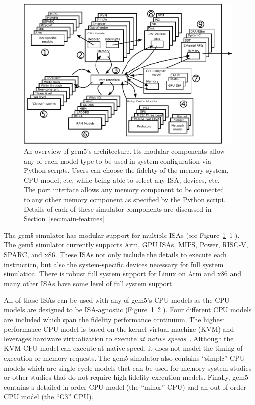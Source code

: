 \begin{figure}
  \centering
  \includegraphics[width=\textwidth]{fig/gem5-big-picture}
  \caption{An overview of gem5's architecture. Its modular components allow any of each model type to be used in system configuration via Python scripts. Users can choose the fidelity of the memory system, CPU model, etc. while being able to select any ISA, devices, etc. The port interface allows any memory component to be connected to any other memory component as specified by the Python script. Details of each of these simulator components are discussed in Section~\ref{sec:main-features}}
  \label{fig:gem5-big-picture}
\end{figure}

The gem5 simulator has modular support for multiple ISAs (see Figure~\ref{fig:gem5-big-picture}~\textcircled{1}).
The gem5 simulator currently supports Arm, GPU ISAs, MIPS, Power, RISC-V, SPARC, and x86.
These ISAs not only include the details to execute each instruction, but also the system-specific devices necessary for full system simulation.
There is robust full system support for Linux on Arm and x86 and many other ISAs have some level of full system support.

All of these ISAs can be used with any of gem5's CPU models as the CPU models are designed to be ISA-agnostic (Figure~\ref{fig:gem5-big-picture}~\textcircled{2}).
Four different CPU models are included which span the fidelity performance continuum.
The highest performance CPU model is based on the kernel virtual machine (KVM) and leverages hardware virtualization to execute \emph{at native speeds}~\cite{full-speed-ahead}.
Although the KVM CPU model can execute at native speed, it does not model the timing of execution or memory requests.
The gem5 simulator also contains ``simple'' CPU models which are single-cycle models that can be used for memory system studies or other studies that do not require high-fidelity execution models.
Finally, gem5 contains a detailed in-order CPU model (the ``minor'' CPU) and an out-of-order CPU model (the ``O3'' CPU).

